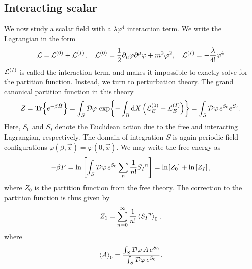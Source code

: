\subsection{Interacting scalar}

We now study a scalar field with a $\lambda \varphi^4$ interaction term.
We write the Lagrangian in the form
\begin{equation*}
    \mathcal{L} = \mathcal{L}^{(0)} + \mathcal{L}^{(I)}, \quad 
    \mathcal{L}^{(0)} = 
    \frac{1}{2} \partial_\mu \varphi \partial^\mu \varphi  + m^2 \varphi^2 , \quad
    \mathcal{L}^{(I)} = - \frac{\lambda}{4!} \varphi^4
\end{equation*}
$\mathcal{L}^{(I)}$ is called the interaction term, and makes it impossible to exactly solve for the partition function.
Instead, we turn to perturbation theory.
The grand canonical partition function in this theory
\begin{equation}
    Z = \Tr{e^{- \beta \hat H}}
    = \int_S \mathcal{D} \varphi \, \exp{
        - \int_\Omega \dd X \left(\mathcal{L}_E^{(0)} + \mathcal{L}_E^{(I)}\right)
    }
    = \int_S \mathcal{D} \varphi \, e^{S_0} e^{S_I}.
\end{equation}
Here, $S_0$ and $S_I$ denote the Euclidean action due to the free and interacting Lagrangian, respectively.
The domain of integration $S$ is again periodic field configurations $\varphi(\beta, \vec x) = \varphi(0, \vec x)$.
We may write the free energy as
\begin{equation*}
    - \beta F = \ln
    \left[
        \int_S \mathcal{D} \varphi \, e^{S_0} \sum_n \frac{1}{n!} {S_I}^n
    \right]
    = \ln[Z_0] 
    + \ln
    \left[
        Z_I
    \right],
\end{equation*}
where $Z_0$ is the partition function from the free theory.
The correction to the partition function is thus given by
\begin{equation}
    Z_1 = \sum_{n=0}^\infty \frac{1}{n!} \ex{{S_I}^n}_0,
\end{equation}
where
\begin{equation}
    \ex{A}_0 = \frac{
        \int_S \D \varphi \, A \, e^{S_0} }
    {\int_S \D \varphi \, e^{S_0}}.
\end{equation}
